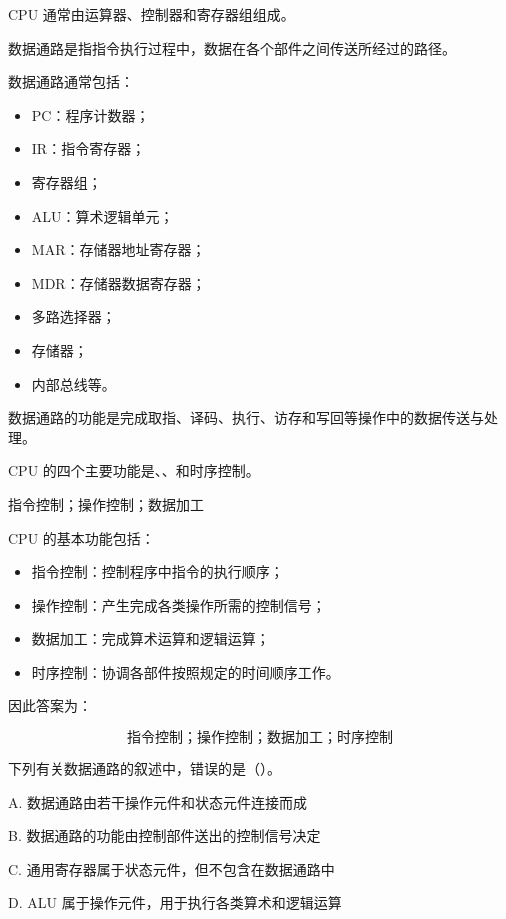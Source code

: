 \begin{knowledge}
CPU 通常由运算器、控制器和寄存器组组成。

数据通路是指指令执行过程中，数据在各个部件之间传送所经过的路径。

数据通路通常包括：
\begin{itemize}
    \item PC：程序计数器；
    \item IR：指令寄存器；
    \item 寄存器组；
    \item ALU：算术逻辑单元；
    \item MAR：存储器地址寄存器；
    \item MDR：存储器数据寄存器；
    \item 多路选择器；
    \item 存储器；
    \item 内部总线等。
\end{itemize}

数据通路的功能是完成取指、译码、执行、访存和写回等操作中的数据传送与处理。
\end{knowledge}


\begin{question}
CPU 的四个主要功能是\underline{\hspace{2cm}}、\underline{\hspace{2cm}}、\underline{\hspace{2cm}}和时序控制。
\end{question}

\begin{answer}
指令控制；操作控制；数据加工
\end{answer}

\begin{analysisenv}
CPU 的基本功能包括：

\begin{itemize}
    \item 指令控制：控制程序中指令的执行顺序；
    \item 操作控制：产生完成各类操作所需的控制信号；
    \item 数据加工：完成算术运算和逻辑运算；
    \item 时序控制：协调各部件按照规定的时间顺序工作。
\end{itemize}

因此答案为：

\[
\text{指令控制；操作控制；数据加工；时序控制}
\]
\end{analysisenv}


\begin{question}
下列有关数据通路的叙述中，错误的是（）。

A. 数据通路由若干操作元件和状态元件连接而成

B. 数据通路的功能由控制部件送出的控制信号决定

C. 通用寄存器属于状态元件，但不包含在数据通路中

D. ALU 属于操作元件，用于执行各类算术和逻辑运算
\end{question}

